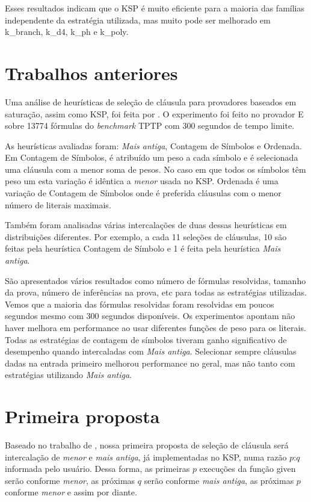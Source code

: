 Esses resultados indicam que o KSP é muito eficiente para a maioria das famílias independente da estratégia utilizada, mas muito pode ser melhorado em k\_branch, k\_d4, k\_ph e k\_poly.

\section{Trabalhos anteriores}
Uma análise de heurísticas de seleção de cláusula para provadores baseados em saturação, assim como KSP, foi feita por \cite{stephan}. O experimento foi feito no provador E sobre 13774 fórmulas do \textit{benchmark} TPTP \cite{TPTP} com 300 segundos de tempo limite.

As heurísticas avaliadas foram: \textit{Mais antiga}, Contagem de Símbolos e Ordenada. Em Contagem de Símbolos, é atribuído um peso a cada símbolo e é selecionada uma cláusula com a menor soma de pesos. No caso em que todos os símbolos têm peso um esta variação é idêntica a \textit{menor} usada no KSP. Ordenada é uma variação de Contagem de Símbolos onde é preferida cláusulas com o menor número de literais maximais.

Também foram analisadas várias intercalações de duas dessas heurísticas em distribuições diferentes. Por exemplo, a cada 11 seleções de cláusulas, 10 são feitas pela heurística Contagem de Símbolo e 1 é feita pela heurística \textit{Mais antiga}.

São apresentados vários resultados como número de fórmulas resolvidas, tamanho da prova, número de inferências na prova, etc para todas as estratégias utilizadas. Vemos que a maioria das fórmulas resolvidas foram resolvidas em poucos segundos mesmo com 300 segundos disponíveis. Os experimentos apontam não haver melhora em performance ao usar diferentes funções de peso para os literais. Todas as estratégias de contagem de símbolos tiveram ganho significativo de desempenho quando intercaladas com \textit{Mais antiga}. Selecionar sempre cláusulas dadas na entrada primeiro melhorou performance no geral, mas não tanto com estratégias utilizando \textit{Mais antiga}.

\section{Primeira proposta} \label{secao:1proposta}
Baseado no trabalho de \cite{stephan}, nossa primeira proposta de seleção de cláusula será intercalação de \textit{menor} e \textit{mais antiga}, já implementadas no KSP, numa razão $p$:$q$ informada pelo usuário. Dessa forma, as primeiras $p$ execuções da função {\sf given} serão conforme \textit{menor}, as próximas $q$ serão conforme \textit{mais antiga}, as próximas $p$ conforme \textit{menor} e assim por diante.

